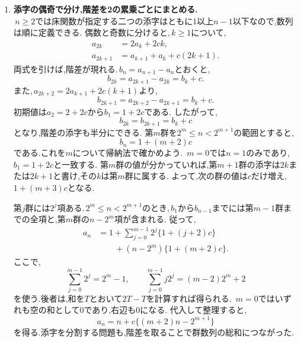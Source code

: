 \begin{enumerate}[label=(\arabic*),parsep=3pt,format=\bookitemlink{example-gauss-integer-draft}{solution}{problem}]
      \item \textbf{添字の偶奇で分け,階差を2の累乗ごとにまとめる.}\\
            \,$n\ge2$では床関数が指定する二つの添字はともに1以上$n-1$以下なので,数列は順に定義できる.
            偶数と奇数に分けると,\,$k\ge1$について,
            \[
              \begin{aligned}
                a_{2k}&=2a_k+2ck,\\
                a_{2k+1}&=a_{k+1}+a_k+c(2k+1).
              \end{aligned}
            \]
            両式を引けば,階差が現れる.\,$b_n=a_{n+1}-a_n$とおくと,
            \[
              b_{2k}=a_{2k+1}-a_{2k}=b_k+c.
            \]
            また,\,$a_{2k+2}=2a_{k+1}+2c(k+1)$より,
            \[
              b_{2k+1}=a_{2k+2}-a_{2k+1}=b_k+c.
            \]
            初期値は$a_2=2+2c$から$b_1=1+2c$である.
            したがって,
            \[
              b_{2k}=b_{2k+1}=b_k+c
            \]
            となり,階差の添字も半分にできる.
            第$m$群を$2^m\le n<2^{m+1}$の範囲とすると,
            \[
              b_n=1+(m+2)c
            \]
            である.これを$m$について帰納法で確かめよう.
            \,$m=0$では$n=1$のみであり,\,$b_1=1+2c$と一致する.
            第$m$群の値が分かっていれば,第$m+1$群の添字は$2k$または$2k+1$と書け,その$k$は第$m$群に属する.
            よって,次の群の値は$c$だけ増え,\,$1+(m+3)c$となる.

            第$j$群には$2^j$項ある.\,$2^m\le n<2^{m+1}$のとき,\,$b_1$から$b_{n-1}$までには第$m-1$群までの全項と,第$m$群の$n-2^m$項が含まれる.
            従って,
            \begin{align*}
              a_n
                &=1+\sum_{j=0}^{m-1}2^j\{1+(j+2)c\}\\
                &\qquad +(n-2^m)\{1+(m+2)c\}.
            \end{align*}
            ここで,
            \[
              \sum_{j=0}^{m-1}2^j=2^m-1,\qquad
              \sum_{j=0}^{m-1}j2^j=(m-2)2^m+2
            \]
            を使う.後者は,和を$T$とおいて$2T-T$を計算すれば得られる.
            \,$m=0$ではいずれも空の和として0であり,右辺も0になる.
            代入して整理すると,
            \[
              a_n=n+c\{(m+2)n-2^{m+1}\}
            \]
            を得る.添字を分割する問題も,階差を取ることで群数列の総和につながった.
    \end{enumerate}
